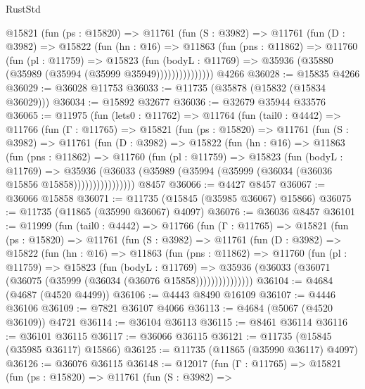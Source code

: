 \begin{lexlean}{RustStd}
\begin{coremodule}
          @15821
            (fun (ps : @15820) =>
            @11761
              (fun (S : @3982) =>
              @11761
                (fun (D : @3982) =>
                @15822
                  (fun (hn : @16) =>
                  @11863
                    (fun (pns : @11862) =>
                    @11760
                      (fun (pl : @11759) =>
                      @15823
                        (fun (bodyL : @11769) =>
                        @35936 (@35880 (@35989 (@35994 (@35999 @35949)))))))))))))))
    @4266
@36028 := @15835 @4266
@36029 := @36028 @11753
@36033 := @11735 (@35878 (@15832 (@15834 @36029)))
@36034 := @15892 @32677
@36036 := @32679 @35944 @33576
@36065 := @11975
    (fun (lets0 : @11762) =>
    @11764
      (fun (tail0 : @4442) =>
      @11766
        (fun (Γ : @11765) =>
        @15821
          (fun (ps : @15820) =>
          @11761
            (fun (S : @3982) =>
            @11761
              (fun (D : @3982) =>
              @15822
                (fun (hn : @16) =>
                @11863
                  (fun (pns : @11862) =>
                  @11760
                    (fun (pl : @11759) =>
                    @15823
                      (fun (bodyL : @11769) =>
                      @35936
                        (@36033
                          (@35989 (@35994 (@35999 (@36034 (@36036 @15856 @15858))))))))))))))))
    @8457
@36066 := @4427 @8457
@36067 := @36066 @15858
@36071 := @11735 (@15845 (@35985 @36067) @15866)
@36075 := @11735 (@11865 (@35990 @36067) @4097)
@36076 := @36036 @8457
@36101 := @11999
    (fun (tail0 : @4442) =>
    @11766
      (fun (Γ : @11765) =>
      @15821
        (fun (ps : @15820) =>
        @11761
          (fun (S : @3982) =>
          @11761
            (fun (D : @3982) =>
            @15822
              (fun (hn : @16) =>
              @11863
                (fun (pns : @11862) =>
                @11760
                  (fun (pl : @11759) =>
                  @15823
                    (fun (bodyL : @11769) =>
                    @35936 (@36033 (@36071 (@36075 (@35999 (@36034 (@36076 @15858)))))))))))))))
@36104 := @4684 (@4687 (@4520 @4499))
@36106 := @4443 @8490 @16109
@36107 := @4446 @36106
@36109 := @7821 @36107 @4066
@36113 := @4684 (@5067 (@4520 @36109)) @4721
@36114 := @36104 @36113
@36115 := @8461 @36114
@36116 := @36101 @36115
@36117 := @36066 @36115
@36121 := @11735 (@15845 (@35985 @36117) @15866)
@36125 := @11735 (@11865 (@35990 @36117) @4097)
@36126 := @36076 @36115
@36148 := @12017
    (fun (Γ : @11765) =>
    @15821
      (fun (ps : @15820) =>
      @11761
        (fun (S : @3982) =>

\end{coremodule}
\end{lexlean}
